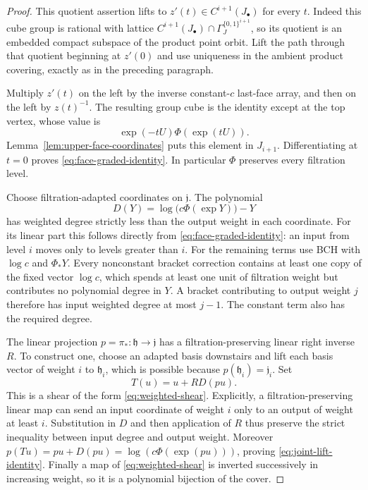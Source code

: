 \begin{proof}
This quotient assertion lifts to
$z'(t)\in C^{i+1}(J_\bullet)$ for every $t$.  Indeed this cube group
is rational with lattice
$C^{i+1}(J_\bullet)\cap\Gamma_J^{\{0,1\}^{i+1}}$, so its quotient is
an embedded compact subspace of the product point orbit.  Lift the path
through that quotient beginning at $z'(0)$ and use uniqueness in the
ambient product covering, exactly as in the preceding paragraph.

Multiply $z'(t)$ on the left by the inverse constant-$c$ last-face
array, and then on the left by $z(t)^{-1}$.  The resulting group cube
is the identity except at the top vertex, whose value is
\[
 \exp(-tU)\Phi(\exp(tU)).
\]
Lemma~\ref{lem:upper-face-coordinates} puts this element in $J_{i+1}$.
Differentiating at $t=0$ proves \eqref{eq:face-graded-identity}.
In particular $\Phi$ preserves every filtration level.

Choose filtration-adapted coordinates on $\mathfrak j$.  The polynomial
\begin{equation}
 D(Y)=\log\bigl(c\Phi(\exp Y)\bigr)-Y
 \label{eq:affine-log-displacement}
\end{equation}
has weighted degree strictly less than the output weight in each
coordinate.  For its linear part this follows directly from
\eqref{eq:face-graded-identity}: an input from level $i$ moves only to
levels greater than $i$.  For the remaining terms use BCH with
$\log c$ and $\Phi_*Y$.  Every nonconstant bracket correction contains
at least one copy of the fixed vector $\log c$, which spends at least
one unit of filtration weight but contributes no polynomial degree in
$Y$.  A bracket contributing to output weight $j$ therefore has input
weighted degree at most $j-1$.  The constant term also has the required
degree.

The linear projection
$p=\pi_*:\mathfrak h\to\mathfrak j$ has a filtration-preserving linear
right inverse $R$.  To construct one, choose an adapted basis downstairs
and lift each basis vector of weight $i$ to $\mathfrak h_i$, which is
possible because $p(\mathfrak h_i)=\mathfrak j_i$.  Set
\begin{equation}
 T(u)=u+R D(pu).
 \label{eq:cover-shear-construction}
\end{equation}
This is a shear of the form \eqref{eq:weighted-shear}.  Explicitly, a
filtration-preserving linear map can send an input coordinate of weight
$i$ only to an output of weight at least $i$.  Substitution in $D$ and
then application of $R$ thus preserve the strict inequality between
input degree and output weight.  Moreover
$p(Tu)=pu+D(pu)=\log(c\Phi(\exp(pu)))$, proving
\eqref{eq:joint-lift-identity}.  Finally a map of
\eqref{eq:weighted-shear} is inverted successively in increasing
weight, so it is a polynomial bijection of the cover.
\end{proof}

